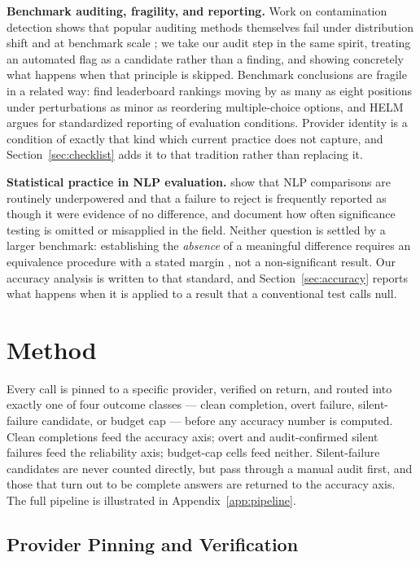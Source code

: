 \documentclass[11pt]{article}
\begin{document}
\textbf{Benchmark auditing, fragility, and reporting.} Work on
contamination detection shows that popular auditing methods themselves
fail under distribution shift and at benchmark scale
\citep{reliability_gap_audit2026}; we take our audit step in the same
spirit, treating an automated flag as a candidate rather than a
finding, and showing concretely what happens when that principle is
skipped. Benchmark conclusions are fragile in a related way:
\citet{alzahrani2024benchmarks} find leaderboard rankings moving by as
many as eight positions under perturbations as minor as reordering
multiple-choice options, and HELM \citep{liang2023helm} argues for
standardized reporting of evaluation conditions. Provider identity is
a condition of exactly that kind which current practice does not
capture, and Section~\ref{sec:checklist} adds it to that tradition
rather than replacing it.

\textbf{Statistical practice in NLP evaluation.} \citet{card2020power}
show that NLP comparisons are routinely underpowered and that a
failure to reject is frequently reported as though it were evidence of
no difference, and \citet{dror2018hitchhiker} document how often
significance testing is omitted or misapplied in the field. Neither
question is settled by a larger benchmark: establishing the
\emph{absence} of a meaningful difference requires an equivalence
procedure with a stated margin \citep{lakens2017tost}, not a
non-significant result. Our accuracy analysis is written to that
standard, and Section~\ref{sec:accuracy} reports what happens when it
is applied to a result that a conventional test calls null.

\section{Method}

Every call is pinned to a specific provider, verified on return, and
routed into exactly one of four outcome classes --- clean completion,
overt failure, silent-failure candidate, or budget cap --- before any
accuracy number is computed. Clean completions feed the accuracy axis;
overt and audit-confirmed silent failures feed the reliability axis;
budget-cap cells feed neither. Silent-failure candidates are never
counted directly, but pass through a manual audit first, and those
that turn out to be complete answers are returned to the accuracy
axis. The full pipeline is illustrated in Appendix~\ref{app:pipeline}.
\subsection{Provider Pinning and Verification}
\end{document}
